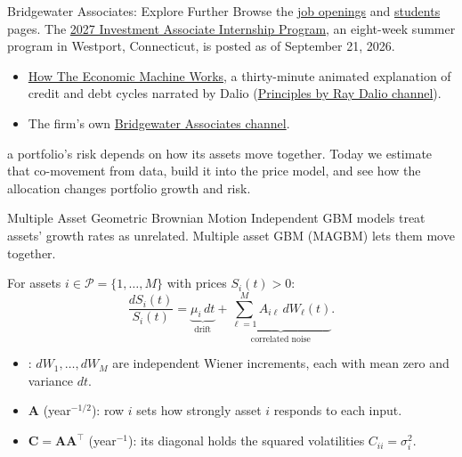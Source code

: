 \documentclass[aspectratio=169,11pt]{beamer}
\newcommand{\bA}{\mathbf{A}}
\newcommand{\bC}{\mathbf{C}}
\begin{document}
\begin{frame}{Bridgewater Associates: Explore Further}
 Browse the
\href{https://www.bridgewater.com/working-at-bridgewater/job-openings}{job openings}
and \href{https://www.bridgewater.com/working-at-bridgewater/students}{students}
pages. The
\href{https://www.bridgewater.com/2027-investment-associate-internship-program}{2027 Investment Associate Internship Program},
an eight-week summer program in Westport, Connecticut, is posted as of
September 21, 2026.

\vspace{0.6em}
\begin{itemize}\setlength{\itemsep}{0.6em}
\item \href{https://varnerlab.org/watch.html?v=PHe0bXAIuk0}{How The Economic Machine Works},
  a thirty-minute animated explanation of credit and debt cycles narrated by Dalio
  \quad (\href{https://www.youtube.com/@principlesbyraydalio}{Principles by Ray Dalio channel}).
\item The firm's own \href{https://www.youtube.com/@Bridgewater}{Bridgewater Associates channel}.
\end{itemize}

\vspace{0.5em}
 a portfolio's risk depends on how its assets
move together. Today we estimate that co-movement from data, build it into the
price model, and see how the allocation changes portfolio growth and risk.
\end{frame}

\begin{frame}{Multiple Asset Geometric Brownian Motion}
  Independent GBM models treat assets' growth rates as unrelated.
  Multiple asset GBM (MAGBM) lets them move together.

  \vspace{0.4em}
  For assets $i\in\mathcal P=\{1,\ldots,M\}$ with prices $S_i(t)>0$:
  \[
    \frac{dS_i(t)}{S_i(t)}
    =\underbrace{\mu_i\,dt}_{\text{drift}}
    +\underbrace{\textstyle\sum_{\ell=1}^{M}A_{i\ell}\,dW_\ell(t)}_{\text{correlated noise}}.
  \]
  \begin{itemize}\setlength{\itemsep}{0.45em}
    \item {}: $dW_1,\ldots,dW_M$ are independent Wiener
      increments, each with mean zero and variance $dt$.
    \item {} $\bA$ (year$^{-1/2}$): row $i$ sets how
      strongly asset $i$ responds to each input.
    \item {} $\bC=\bA\bA^{\top}$ (year$^{-1}$): its
      diagonal holds the squared volatilities $C_{ii}=\sigma_i^2$.
  \end{itemize}
\end{frame}
\end{document}
